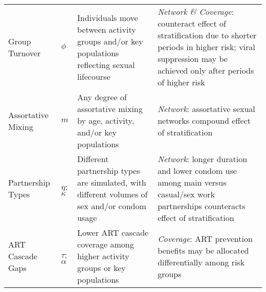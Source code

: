 \begin{tabular}{llp{.38\linewidth}p{.4\linewidth}}
  Group Turnover
& $\phi$
& Individuals move between activity groups and/or key populations reflecting sexual lifecourse
& \emph{Network \& Coverage}: counteract effect of stratification due to shorter periods in higher risk;\cite{}
  viral suppression may be achieved only after periods of higher risk
\\
  Assortative Mixing
& $m$
& Any degree of assortative mixing by age, activity, and/or key populations
& \emph{Network}: assortative sexual networks compound effect of stratification\cite{}
\\
  Partnership Types
& $\eta$; $\kappa$
& Different partnership types are simulated, with different volumes of sex and/or condom usage
& \emph{Network}: longer duration and lower condom use among main versus casual/sex work partnerships
  counteracts effect of stratification
\\
  ART Cascade Gaps
& $\tau$; $\alpha$
& Lower ART cascade coverage among higher activity groups or key populations\cite{}
& \emph{Coverage}: ART prevention benefits may be allocated differentially among risk groups\cite{}
\\
\bottomrule
\end{tabular}
